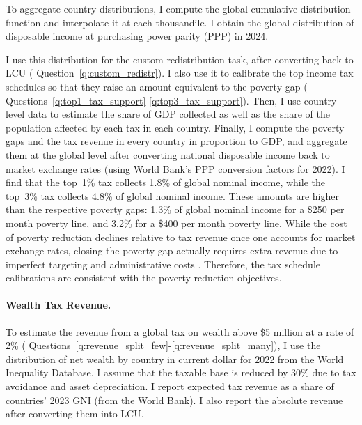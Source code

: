 To aggregate country distributions, I compute the global cumulative distribution function and interpolate it at each thousandile. I obtain the global distribution of disposable income at purchasing power parity (PPP) in 2024. 

I use this distribution for the custom redistribution task, after converting back to LCU (%
Question~\ref{q:custom_redistr}). I also use it to calibrate the top income tax schedules so that they raise an amount equivalent to the poverty gap (%
Questions~\ref{q:top1_tax_support}-\ref{q:top3_tax_support}). %
Then, I use country-level data to estimate the share of GDP collected as well as the share of the population affected by each tax in each country. 
Finally, I compute the poverty gaps and the tax revenue in every country in proportion to GDP, and aggregate them at the global level after converting national disposable income back to market exchange rates (using World Bank's PPP conversion factors for 2022). 
I find that the top~1\% tax collects 1.8\% of global nominal income, while the top~3\% tax collects 4.8\% of global nominal income. These amounts are higher than the respective poverty gaps: 1.3\% of global nominal income for a \$250 per month poverty line, and 3.2\% for a \$400 per month poverty line. 
While the cost of poverty reduction declines relative to tax revenue once one accounts  for market exchange rates, closing the poverty gap actually requires extra revenue due to imperfect targeting and administrative costs \citep{sahoo_what_2025}. Therefore, the tax schedule calibrations are consistent with the poverty reduction objectives.

\paragraph{Wealth Tax Revenue.}

To estimate the revenue from a global tax on wealth above \$5 million at a rate of 2\% (%
Questions~\ref{q:revenue_split_few}-\ref{q:revenue_split_many}), I use the distribution of net wealth by country in current dollar for 2022 from the World Inequality Database. I assume that the taxable base is reduced by 30\% due to tax avoidance and asset depreciation. I report expected tax revenue as a share of countries' 2023 GNI (from the World Bank). I also report the absolute revenue after converting them into LCU. 

